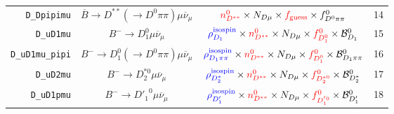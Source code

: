 \begin{landscape}
\begin{table}
\begin{tabular}{r|c|c|l}
      \texttt{D\_Dpipimu} &  $\overline{B} \rightarrow D^{**} (\rightarrow D^0 \pi\pi) \mu \overline{\nu}_\mu$   &                                                                                                                                    $\textcolor{red}{n^{0}_{D^{**}}} \times N_{D \mu} \times \textcolor{red}{f_\text{guess}} \times f^0_{D^{0}\pi\pi}$                                                                                                                                    & 14               \\
        \texttt{D\_uD1mu} &                    $B^- \rightarrow D_1^0 \mu \overline{\nu}_\mu$                    &                                                                                                         $\textcolor{blue}{\rho^\text{isospin}_{D_1}} \times \textcolor{red}{n^{0}_{D^{**}}} \times N_{D \mu} \times \textcolor{red}{f^{0}_{D_1^0}} \times \mathcal{B}^{0}_{D_1}$                                                                                                         & 15               \\
  \texttt{D\_uD1mu\_pipi} &       $B^- \rightarrow D_1^0 (\rightarrow D^0 \pi\pi) \mu \overline{\nu}_\mu$        &                                                                                                   $\textcolor{blue}{\rho^\text{isospin}_{D_1\pi\pi}} \times \textcolor{red}{n^{0}_{D^{**}}} \times N_{D \mu} \times \textcolor{red}{f^{0}_{D_1^0}} \times \mathcal{B}^{0}_{D_1\pi\pi}$                                                                                                   & 16               \\
        \texttt{D\_uD2mu} &                  $B^- \rightarrow D_2^{*0} \mu \overline{\nu}_\mu$                   &                                                                                                     $\textcolor{blue}{\rho^\text{isospin}_{D_2^*}} \times \textcolor{red}{n^{0}_{D^{**}}} \times N_{D \mu} \times \textcolor{red}{f^{0}_{D_2^{*0}}} \times \mathcal{B}^{0}_{D_2^*}$                                                                                                      & 17               \\
       \texttt{D\_uD1pmu} &                  $B^- \rightarrow {D'_1}^0 \mu \overline{\nu}_\mu$                   &                                                                                                      $\textcolor{blue}{\rho^\text{isospin}_{D'_1}} \times \textcolor{red}{n^{0}_{D^{**}}} \times N_{D \mu} \times \textcolor{red}{f^{0}_{D_1^{'0}}} \times \mathcal{B}^{0}_{D'_1}$                                                                                                       & 18               \\

\end{tabular}
\end{table}
\end{landscape}
